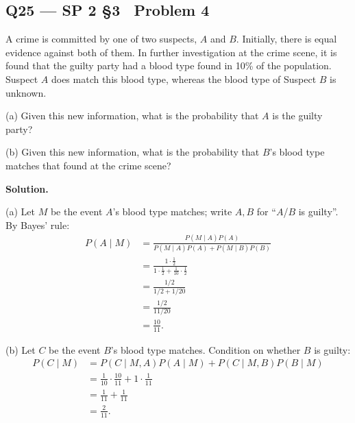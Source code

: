 \documentclass[11pt]{article}
\begin{document}
\subsection*{Q25 --- SP 2 \S3 \textperiodcentered\ Problem 4}
\begin{qbox}
A crime is committed by one of two suspects, $A$ and $B$. Initially, there is equal evidence against both of them. In further investigation at the crime scene, it is found that the guilty party had a blood type found in 10\% of the population. Suspect $A$ does match this blood type, whereas the blood type of Suspect $B$ is unknown.

(a) Given this new information, what is the probability that $A$ is the guilty party?

(b) Given this new information, what is the probability that $B$'s blood type matches that found at the crime scene?
\end{qbox}
\textbf{Solution.}

(a) Let $M$ be the event $A$'s blood type matches; write $A,B$ for ``$A$/$B$ is guilty''. By Bayes' rule:
\begin{align*}
P(A\mid M) &= \frac{P(M\mid A)P(A)}{P(M\mid A)P(A)+P(M\mid B)P(B)} \\
&= \frac{1\cdot \tfrac12}{1\cdot\tfrac12 + \tfrac{1}{10}\cdot\tfrac12} \\
&= \frac{1/2}{1/2+1/20} \\
&= \frac{1/2}{11/20} \\
&= \frac{10}{11}.
\end{align*}

(b) Let $C$ be the event $B$'s blood type matches. Condition on whether $B$ is guilty:
\begin{align*}
P(C\mid M) &= P(C\mid M,A)P(A\mid M) + P(C\mid M,B)P(B\mid M) \\
&= \frac{1}{10}\cdot\frac{10}{11} + 1\cdot\frac{1}{11} \\
&= \frac{1}{11}+\frac{1}{11} \\
&= \frac{2}{11}.
\end{align*}
\end{document}
